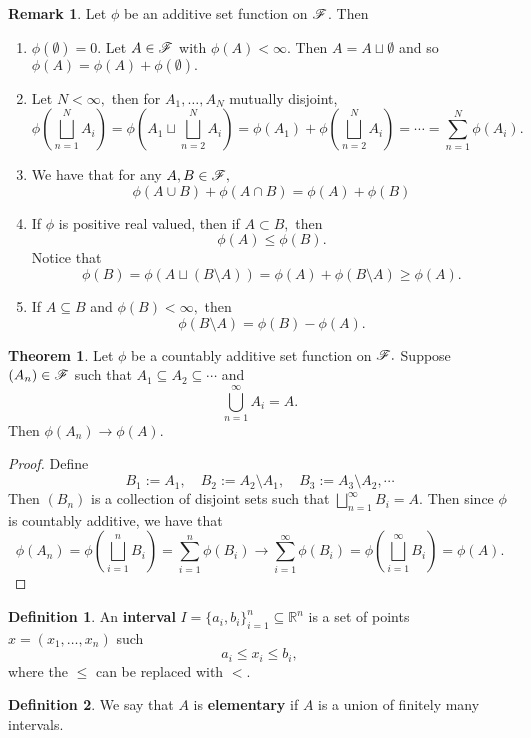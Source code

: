 \documentclass[10pt, oneside]{article}
\newcommand{\bbR}{\mathbb{R}}
\newcommand{\sm}{\setminus}
\theoremstyle{definition}
\newtheorem{thm}{Theorem}
\newtheorem{defn}{Definition}
\newtheorem{rem}{Remark}
\begin{document}
\begin{rem}
    Let $\phi$ be an additive set function on $\cal F$. Then 
    \begin{enumerate}
        \item $\phi(\emptyset) = 0.$ Let $A\in \cal F$ with $\phi(A) < \infty.$ Then $A = A \sqcup \emptyset$ and so $\phi(A) = \phi(A)+ \phi(\emptyset).$
        \item Let $N < \infty,$ then for $A_1, \dots, A_N$ mutually disjoint, 
        \[\phi\left(\bigsqcup_{n=1}^N A_i\right) = \phi\left(A_1 \sqcup \bigsqcup_{n=2}^N A_i\right) = \phi(A_1) + \phi\left(\bigsqcup_{n=2}^N A_i\right) = \cdots = \sum_{n=1}^N \phi(A_i).\]
        \item We have that for any $A,B \in \cal F,$ 
        \[\phi(A\cup B) + \phi(A\cap B) =  \phi(A)+ \phi(B)\]
        \item If $\phi$ is positive real valued, then if $A \subset B,$ then 
        \[\phi(A) \leq \phi(B).\] Notice that 
        \[\phi(B) = \phi(A \sqcup (B\sm A)) = \phi(A) + \phi(B\sm A) \geq \phi(A).\]
        \item If $A\subseteq B$ and $\phi(B) < \infty,$ then 
        \[\phi(B\sm A) = \phi(B) - \phi(A).\]
    \end{enumerate}
\end{rem}

\begin{thm}
    Let $\phi$ be a countably additive set function on $\cal F.$ Suppose $(A_n) \in \cal F$ such that $A_1 \subseteq A_2 \subseteq \cdots $ and 
    \[\bigcup_{n=1}^\infty A_i = A.\] Then $\phi(A_n) \to \phi(A).$
\end{thm}
\begin{proof}
    Define 
    \[B_1:= A_1, \quad B_2 := A_2 \sm A_1, \quad B_3:= A_3 \sm A_2, \cdots \] Then $(B_n)$ is a collection of disjoint sets such that $\bigsqcup_{n=1}^\infty B_i = A.$ Then since $\phi$ is countably additive, we have that
    \[\phi(A_n) = \phi(\bigsqcup_{i=1}^n B_i) = \sum_{i=1}^n \phi(B_i)\to \sum_{i=1}^\infty\phi(B_i) = \phi(\bigsqcup_{i=1}^\infty B_i)= \phi(A).\]
\end{proof}

\begin{defn}
    An \textbf{interval} $I = \{a_i, b_i\}_{i=1}^n \subseteq \bbR^n$ is a set of points $x = (x_1, \dots, x_n)$ such 
    \[a_i \leq x_i \leq b_i,\] where the $\leq$ can be replaced with $<.$
\end{defn}

\begin{defn}
    We say that $A$ is \textbf{elementary} if $A$ is a union of finitely many intervals. 
\end{defn}
\end{document}
